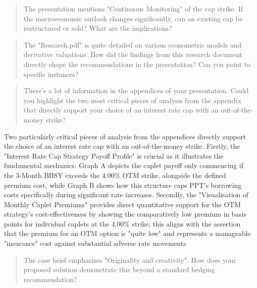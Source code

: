 \documentclass[11pt, a4paper, british]{article}
\begin{document}
\newpage

\begin{quote}
    The presentation mentions "Continuous Monitoring" of the cap strike. If the macroeconomic outlook changes significantly, can an existing cap be restructured or sold? What are the implications?
\end{quote}



\newpage

\begin{quote}
    The "Research.pdf" is quite detailed on various econometric models and derivative valuations. How did the findings from this research document directly shape the recommendations in the presentation? Can you point to specific instances?
\end{quote}



\newpage

\begin{quote}
    There's a lot of information in the appendices of your presentation. Could you highlight the two most critical pieces of analysis from the appendix that directly support your choice of an interest rate cap with an out-of-the-money strike?
\end{quote}

Two particularly critical pieces of analysis from the appendices directly support the choice of an interest rate cap with an out-of-the-money strike. Firstly, the "Interest Rate Cap Strategy Payoff Profile"  is crucial as it illustrates the fundamental mechanics: Graph A depicts the caplet payoff only commencing if the 3-Month BBSY exceeds the 4.00\% OTM strike, alongside the defined premium cost, while Graph B shows how this structure caps PPT's borrowing costs specifically during significant rate increases. Secondly, the "Visualisation of Monthly Caplet Premiums"  provides direct quantitative support for the OTM strategy's cost-effectiveness by showing the comparatively low premium in basis points for individual caplets at the 4.00\% strike; this aligns with the assertion that the premium for an OTM option is "quite low"  and represents a manageable "insurance" cost  against substantial adverse rate movements

\newpage

\begin{quote}
    The case brief emphasizes "Originality and creativity". How does your proposed solution demonstrate this beyond a standard hedging recommendation?
\end{quote}
\end{document}

